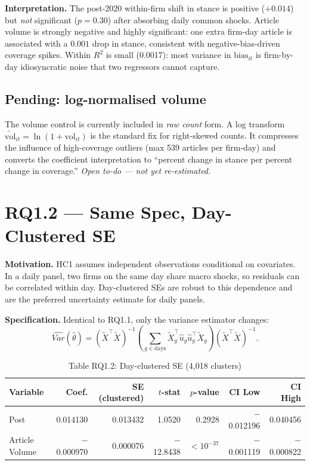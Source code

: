\documentclass[11pt]{article}
\def\mathrm#1{#1}%
\newcommand{\Var}{\mathrm{Var}}
\begin{document}
\textbf{Interpretation.} The post-2020 within-firm shift in stance is positive ($+0.014$) but \emph{not} significant ($p = 0.30$) after absorbing daily common shocks. Article volume is strongly negative and highly significant: one extra firm-day article is associated with a $0.001$ drop in stance, consistent with negative-bias-driven coverage spikes. Within $R^2$ is small (0.0017): most variance in $\text{bias}_{it}$ is firm-by-day idiosyncratic noise that two regressors cannot capture.

\subsection*{Pending: log-normalised volume}
The volume control is currently included in \emph{raw count} form. A log transform $\widetilde{\text{vol}}_{it} = \ln(1 + \text{vol}_{it})$ is the standard fix for right-skewed counts. It compresses the influence of high-coverage outliers (max 539 articles per firm-day) and converts the coefficient interpretation to ``percent change in stance per percent change in coverage.'' \emph{Open to-do --- not yet re-estimated.}

\section*{RQ1.2 --- Same Spec, Day-Clustered SE}\label{sec:rq1.2}
\textbf{Motivation.} HC1 assumes independent observations conditional on covariates. In a daily panel, two firms on the same day share macro shocks, so residuals can be correlated within day. Day-clustered SEs are robust to this dependence and are the preferred uncertainty estimate for daily panels.

\textbf{Specification.} Identical to RQ1.1, only the variance estimator changes:
\[
\widehat{\Var}(\hat{\theta}) = (\tilde{X}^{\top}\tilde{X})^{-1} \left(\sum_{g \in \text{days}} \tilde{X}_g^{\top}\hat{u}_g\hat{u}_g^{\top}\tilde{X}_g\right) (\tilde{X}^{\top}\tilde{X})^{-1}.
\]

\begin{table}[H]
\centering
\caption*{Table RQ1.2: Day-clustered SE (4{,}018 clusters)}
\begin{tabular}{lrrrrrr}
\toprule
Variable & Coef. & SE (clustered) & $t$-stat & $p$-value & CI Low & CI High \\
\midrule
Post & 0.014130 & 0.013432 & 1.0520 & 0.2928 & $-$0.012196 & 0.040456 \\
Article Volume & $-$0.000970 & 0.000076 & $-$12.8438 & $<10^{-37}$ & $-$0.001119 & $-$0.000822 \\
\bottomrule
\end{tabular}
\end{table}
\end{document}
